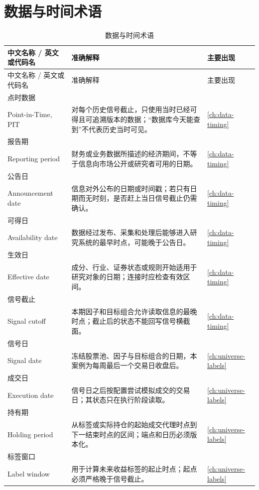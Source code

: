 \section{数据与时间术语}

\begingroup
\footnotesize
\setlength{\tabcolsep}{3pt}
\begin{longtable}{@{}p{3.2cm}p{9.0cm}p{2.8cm}@{}}
\caption{数据与时间术语}\label{tab:appA-data-time-terms}\\
\toprule
中文名称 / 英文或代码名 & 准确解释 & 主要出现 \\
\midrule
\endfirsthead
\toprule
中文名称 / 英文或代码名 & 准确解释 & 主要出现 \\
\midrule
\endhead
点时数据\\Point-in-Time, PIT & 对每个历史信号截止，只使用当时已经可得且可追溯版本的数据；“数据库今天能查到”不代表历史当时可见。 & \cref{ch:data-timing} \\
报告期\\Reporting period & 财务或业务数据所描述的经济期间，不等于信息向市场公开或研究者可用的日期。 & \cref{ch:data-timing} \\
公告日\\Announcement date & 信息对外公布的日期或时间戳；若只有日期而无时刻，是否赶上当日信号截止仍需确认。 & \cref{ch:data-timing} \\
可得日\\Availability date & 数据经过发布、采集和处理后能够进入研究系统的最早时点，可能晚于公告日。 & \cref{ch:data-timing} \\
生效日\\Effective date & 成分、行业、证券状态或规则开始适用于研究对象的日期；连接时应检查有效区间。 & \cref{ch:data-timing} \\
信号截止\\Signal cutoff & 本期因子和目标组合允许读取信息的最晚时点；截止后的状态不能回写信号横截面。 & \cref{ch:data-timing} \\
信号日\\Signal date & 冻结股票池、因子与目标组合的日期，本案例为每周最后一个交易日收盘后。 & \cref{ch:universe-labels} \\
成交日\\Execution date & 信号日之后按配置尝试模拟成交的交易日；其状态只在执行阶段读取。 & \cref{ch:universe-labels} \\
持有期\\Holding period & 从标签或实际持仓的起始成交代理时点到下一结束时点的区间；端点和日历必须版本化。 & \cref{ch:universe-labels} \\
标签窗口\\Label window & 用于计算未来收益标签的起止时点；起点必须严格晚于信号截止。 & \cref{ch:universe-labels} \\

\end{longtable}
